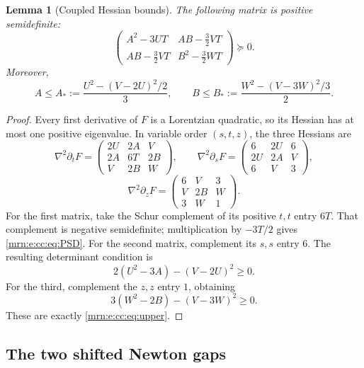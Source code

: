 \documentclass[11pt,a4paper]{article}
\newtheorem{lemma}[theorem]{Lemma}
\theoremstyle{remark}\newtheorem{remark}[theorem]{Remark}
\begin{document}
\begin{lemma}[Coupled Hessian bounds]\label{mrn:e:cc:lem:hessian}
The following matrix is positive semidefinite:
\begin{equation}\label{mrn:e:cc:eq:PSD}
 \begin{pmatrix}
  A^2-3UT&AB-\frac32VT\\
  AB-\frac32VT&B^2-\frac32WT
 \end{pmatrix}\succeq0.
\end{equation}
Moreover,
\begin{equation}\label{mrn:e:cc:eq:upper}
 A\le A_*:=\frac{U^2-(V-2U)^2/2}{3},\qquad
 B\le B_*:=\frac{W^2-(V-3W)^2/3}{2}.
\end{equation}
\end{lemma}
\begin{proof}
Every first derivative of $F$ is a Lorentzian quadratic, so its Hessian has at most one positive eigenvalue. In variable order $(s,t,z)$, the three Hessians are
\[
 \nabla^2\partial_tF=
 \begin{pmatrix}2U&2A&V\\2A&6T&2B\\V&2B&W\end{pmatrix},\qquad
 \nabla^2\partial_sF=
 \begin{pmatrix}6&2U&6\\2U&2A&V\\6&V&3\end{pmatrix},
\]
\[
 \nabla^2\partial_zF=
 \begin{pmatrix}6&V&3\\V&2B&W\\3&W&1\end{pmatrix}.
\]
For the first matrix, take the Schur complement of its positive $t,t$ entry $6T$. That complement is negative semidefinite; multiplication by $-3T/2$ gives \eqref{mrn:e:cc:eq:PSD}. For the second matrix, complement its $s,s$ entry $6$. The resulting determinant condition is
\[
 2(U^2-3A)-(V-2U)^2\ge0.
\]
For the third, complement the $z,z$ entry $1$, obtaining
\[
 3(W^2-2B)-(V-3W)^2\ge0.
\]
These are exactly \eqref{mrn:e:cc:eq:upper}.
\end{proof}

\subsection{The two shifted Newton gaps}
\end{document}
